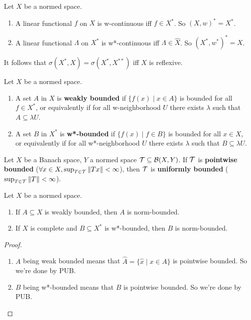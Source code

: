 \documentclass{article}
\begin{document}
\begin{nprop}
  Let $X$ be a normed space.
  \begin{enumerate}
    \item A linear functional $f$ on $X$ is w-continuous iff $f \in X^*$. So $(X, w)^* = X^*$.
    \item A linear functional $\Lambda$ on $X^*$ is w*-continuous iff $\Lambda \in \hat X$. So $(X^*, w^*)^* = X$.
  \end{enumerate}
\end{nprop}

It follows that $\sigma(X^*, X) = \sigma(X^*, X^{**})$ iff $X$ is reflexive.

\begin{defi}
  Let $X$ be a normed space.
  \begin{enumerate}
    \item A set $A$ in $X$ is {\bf weakly bounded} if $\{f(x) \mid x \in A\}$ is bounded for all $f \in X^*$, or equivalently if for all w-neighborhood $U$ there exists $\lambda$ such that $A \subseteq \lambda U$.
    \item A set $B$ in $X^*$ is {\bf w*-bounded} if $\{f(x) \mid f \in B\}$ is bounded for all $x \in X$, or equivalently if for all w*-neighborhood $U$ there exists $\lambda$ such that $B \subseteq \lambda U$.
  \end{enumerate}
\end{defi}

\begin{thm}
  Let $X$ be a Banach space, $Y$ a normed space $\mathcal T \subseteq \mathcal B(X, Y)$. If $\mathcal T$ is {\bf pointwise bounded} ($\forall x \in X, \sup_{T \in \mathcal T} \left\lVert Tx\right\rVert < \infty$), then $\mathcal T$ is {\bf uniformly bounded} ($\sup_{T \in \mathcal T} \left\lVert T\right\rVert < \infty$).
\end{thm}

\begin{nprop}
  Let $X$ be a normed space.
  \begin{enumerate}
    \item If $A \subseteq X$ is weakly bounded, then $A$ is norm-bounded.
    \item If $X$ is complete and $B \subseteq X^*$ is w*-bounded, then $B$ is norm-bounded.
  \end{enumerate}
\end{nprop}
\begin{proof}~
  \begin{enumerate}
    \item $A$ being weak bounded means that $\hat A = \{\hat x \mid x \in A\}$ is pointwise bounded. So we're done by PUB.
    \item $B$ being w*-bounded means that $B$ is pointwise bounded. So we're done by PUB.
  \end{enumerate}
\end{proof}
\end{document}
